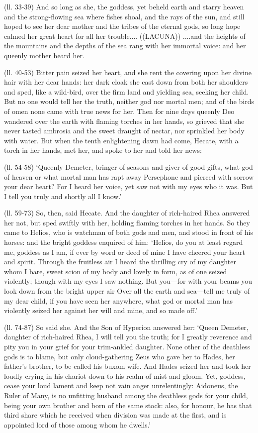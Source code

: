 (ll. 33-39) And so long as she, the goddess, yet beheld earth and starry heaven
and the strong-flowing sea where fishes shoal, and the rays of the sun, and
still hoped to see her dear mother and the tribes of the eternal gods, so long
hope calmed her great heart for all her trouble.... ((LACUNA)) ....and the
heights of the mountains and the depths of the sea rang with her immortal
voice: and her queenly mother heard her.

(ll. 40-53) Bitter pain seized her heart, and she rent the covering upon her
divine hair with her dear hands: her dark cloak she cast down from both her
shoulders and sped, like a wild-bird, over the firm land and yielding sea,
seeking her child. But no one would tell her the truth, neither god nor mortal
men; and of the birds of omen none came with true news for her. Then for nine
days queenly Deo wandered over the earth with flaming torches in her hands, so
grieved that she never tasted ambrosia and the sweet draught of nectar, nor
sprinkled her body with water. But when the tenth enlightening dawn had come,
Hecate, with a torch in her hands, met her, and spoke to her and told her news:

(ll. 54-58) ‘Queenly Demeter, bringer of seasons and giver of good gifts,
what god of heaven or what mortal man has rapt away Persephone and pierced with
sorrow your dear heart? For I heard her voice, yet saw not with my eyes who it
was. But I tell you truly and shortly all I know.’

(ll. 59-73) So, then, said Hecate. And the daughter of rich-haired Rhea
answered her not, but sped swiftly with her, holding flaming torches in her
hands. So they came to Helios, who is watchman of both gods and men, and stood
in front of his horses: and the bright goddess enquired of him: ‘Helios,
do you at least regard me, goddess as I am, if ever by word or deed of mine I
have cheered your heart and spirit. Through the fruitless air I heard the
thrilling cry of my daughter whom I bare, sweet scion of my body and lovely in
form, as of one seized violently; though with my eyes I saw nothing. But
you—for with your beams you look down from the bright upper air Over all
the earth and sea—tell me truly of my dear child, if you have seen her
anywhere, what god or mortal man has violently seized her against her will and
mine, and so made off.’

(ll. 74-87) So said she. And the Son of Hyperion answered her: ‘Queen
Demeter, daughter of rich-haired Rhea, I will tell you the truth; for I greatly
reverence and pity you in your grief for your trim-ankled daughter. None other
of the deathless gods is to blame, but only cloud-gathering Zeus who gave her
to Hades, her father’s brother, to be called his buxom wife. And Hades
seized her and took her loudly crying in his chariot down to his realm of mist
and gloom. Yet, goddess, cease your loud lament and keep not vain anger
unrelentingly: Aidoneus, the Ruler of Many, is no unfitting husband among the
deathless gods for your child, being your own brother and born of the same
stock: also, for honour, he has that third share which he received when
division was made at the first, and is appointed lord of those among whom he
dwells.’

